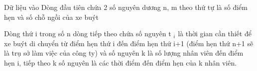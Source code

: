 Dữ liệu vào
Dòng đầu tiên chứa 2 số nguyên dương n, m theo thứ tự là số điểm hẹn và số chỗ ngồi của xe buýt  

   Dòng thứ i trong số n dòng tiếp theo chứa số nguyên t   $_    i   $   là thời gian cần thiết để xe buýt di chuyển từ điểm hẹn thứ i đến điểm hẹn thứ   i+1 (điểm hẹn thứ n+1 sẽ là trụ sở làm việc của công ty) và số nguyên k là số lượng nhân viên đến điểm hẹn i, tiếp theo k số nguyên là các thời điểm đến   điểm hẹn của k nhân viên.